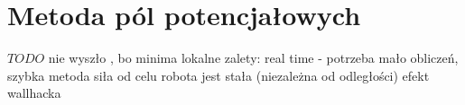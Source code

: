 \section{Metoda pól potencjałowych}
\label{ch:potential-fields}
$TODO$ nie wyszło , bo minima lokalne
zalety: real time - potrzeba mało obliczeń, szybka metoda
siła od celu robota jest stała (niezależna od odległości)
efekt wallhacka